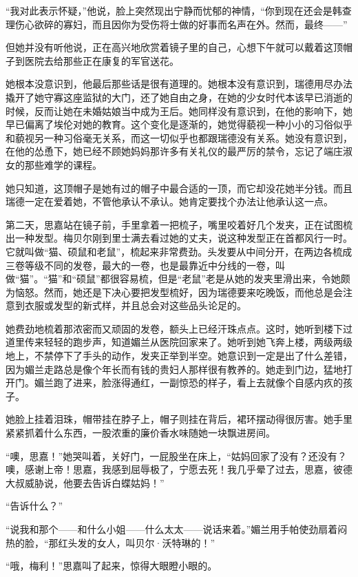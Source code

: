\par “我对此表示怀疑，”他说，脸上突然现出宁静而忧郁的神情，“你到现在还会是韩查理伤心欲碎的寡妇，而且因你为受伤将士做的好事而名声在外。然而，最终——”
\par 但她并没有听他说，正在高兴地欣赏着镜子里的自己，心想下午就可以戴着这顶帽子到医院去给那些正在康复的军官送花。
\par 她根本没意识到，他最后那些话是很有道理的。她根本没有意识到，瑞德用尽办法撬开了她守寡这座监狱的大门，还了她自由之身，在她的少女时代本该早已消逝的时候，反而让她在未婚姑娘当中成为王后。她同样没有意识到，在他的影响下，她早已偏离了埃伦对她的教育。这个变化是逐渐的，她觉得藐视一种小小的习俗似乎和藐视另一种习俗毫无关系，而这一切似乎也都跟瑞德没有关系。她没有意识到，在他的怂恿下，她已经不顾她妈妈那许多有关礼仪的最严厉的禁令，忘记了端庄淑女的那些难学的课程。
\par 她只知道，这顶帽子是她有过的帽子中最合适的一顶，而它却没花她半分钱。而且瑞德一定在爱着她，不管他承认不承认。她肯定要找个办法让他承认这一点。
\par 第二天，思嘉站在镜子前，手里拿着一把梳子，嘴里咬着好几个发夹，正在试图梳出一种发型。梅贝尔刚到里士满去看过她的丈夫，说这种发型正在首都风行一时。它就叫做“猫、硕鼠和老鼠”，梳起来非常费劲。头发要从中间分开，在两边各梳成三卷等级不同的发卷，最大的一卷，也是最靠近中分线的一卷，叫做“猫”。“猫”和“硕鼠”都很容易梳，但是“老鼠”老是从她的发夹里滑出来，令她颇为恼怒。然而，她还是下决心要把发型梳好，因为瑞德要来吃晚饭，而他总是会注意到衣服或发型的新式样，并且总会对这些品头论足的。
\par 她费劲地梳着那浓密而又顽固的发卷，额头上已经汗珠点点。这时，她听到楼下过道里传来轻轻的跑步声，知道媚兰从医院回家来了。她听到她飞奔上楼，两级两级地上，不禁停下了手头的动作，发夹正举到半空。她意识到一定是出了什么差错，因为媚兰走路总是像个年长而有钱的贵妇人那样很有教养的。她走到门边，猛地打开门。媚兰跑了进来，脸涨得通红，一副惊恐的样子，看上去就像个自感内疚的孩子。
\par 她脸上挂着泪珠，帽带挂在脖子上，帽子则挂在背后，裙环摆动得很厉害。她手里紧紧抓着什么东西，一股浓重的廉价香水味随她一块飘进房间。
\par “噢，思嘉！”她哭叫着，关好门，一屁股坐在床上，“姑妈回家了没有？还没有？噢，感谢上帝！思嘉，我感到屈辱极了，宁愿去死！我几乎晕了过去，思嘉，彼德大叔威胁说，他要去告诉白蝶姑妈！”
\par “告诉什么？”
\par “说我和那个——和什么小姐——什么太太——说话来着。”媚兰用手帕使劲扇着闷热的脸，“那红头发的女人，叫贝尔·沃特琳的！”
\par “哦，梅利！”思嘉叫了起来，惊得大眼瞪小眼的。
